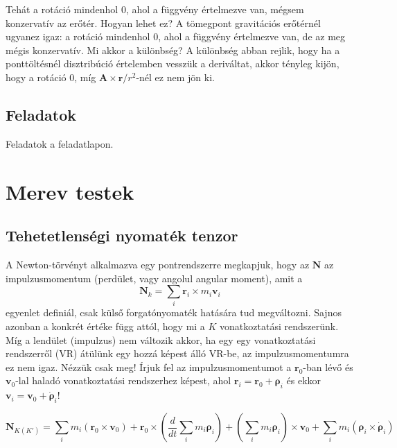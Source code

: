 \documentclass[12pt,a4paper]{scrartcl}
\let\mathbf\bm
\begin{document}
Tehát a rotáció mindenhol 0, ahol a függvény értelmezve van, mégsem konzervatív az erőtér. Hogyan lehet ez? A  tömegpont gravitációs erőtérnél ugyanez igaz: a rotáció mindenhol 0, ahol a függvény értelmezve van, de az meg mégis konzervatív. Mi akkor a különbség? A különbség abban rejlik, hogy ha a ponttöltésnél disztribúció értelemben vesszük a deriváltat, akkor tényleg kijön, hogy a rotáció 0, míg ${\mathbf{A}} \times {\mathbf{r}}/{r^2}$-nél ez nem jön ki.

\subsection{Feladatok}
Feladatok a feladatlapon.

\section{Merev testek}
\subsection{Tehetetlenségi nyomaték tenzor}
A Newton-törvényt alkalmazva egy pontrendszerre megkapjuk, hogy az ${\mathbf{N}}$ az impulzusmomentum (perdület, vagy angolul angular moment), amit a 
\begin{equation}
{\mathbf{N}_k} = \sum\limits_i {{{\mathbf{r}}_i} \times {m_i}{{\mathbf{v}}_i}} 
\end{equation}
egyenlet definiál, csak külső forgatónyomaték hatására tud megváltozni. Sajnos azonban a konkrét értéke függ attól, hogy mi a $K$ vonatkoztatási rendszerünk. Míg a lendület (impulzus) nem változik akkor, ha egy egy vonatkoztatási rendszerről (VR) átülünk egy hozzá képest álló VR-be, az impulzusmomentumra ez nem igaz. Nézzük csak meg! Írjuk fel az impulzusmomentumot a ${{\mathbf{r}}_0}$-ban lévő és ${{\mathbf{v}}_0}$-lal haladó vonatkoztatási rendszerhez képest, ahol ${{\mathbf{r}}_i} = {{\mathbf{r}}_0} + {{\mathbf{\rho }}_i}$ és ekkor ${{\mathbf{v}}_i} = {{\mathbf{v}}_0} + {{\mathbf{\dot \rho }}_i}$!

\[{{\mathbf{N}}_{K\left( {K'} \right)}} = \sum\limits_i {{m_i}\left( {{{\mathbf{r}}_0} \times {{\mathbf{v}}_0}} \right)}  + {{\mathbf{r}}_0} \times \left( {\frac{d}{{dt}}\sum\limits_i {{m_i}{{\mathbf{\rho }}_i}} } \right) + \left( {\sum\limits_i {{m_i}{{\mathbf{\rho }}_i}} } \right) \times {{\mathbf{v}}_0} + \sum\limits_i {{m_i}\left( {{{\mathbf{\rho }}_i} \times {{{\mathbf{\dot \rho }}}_i}} \right)} \]
\end{document}
